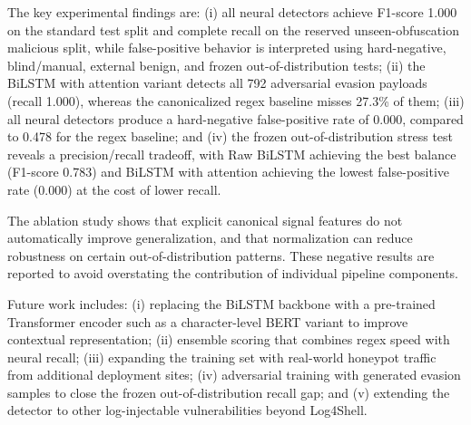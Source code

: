 \documentclass[conference]{IEEEtran}
\begin{document}
The key experimental findings are: (i) all neural detectors achieve F1-score
1.000 on the standard test split and complete recall on the reserved
unseen-obfuscation malicious split, while false-positive behavior is
interpreted using hard-negative, blind/manual, external benign, and frozen
out-of-distribution tests; (ii) the BiLSTM with attention variant detects all 792 adversarial evasion
payloads (recall 1.000), whereas the canonicalized regex baseline misses
27.3\% of them; (iii) all neural detectors produce a hard-negative
false-positive rate of 0.000, compared to 0.478 for the regex baseline;
and (iv) the frozen out-of-distribution stress test reveals a
precision/recall tradeoff, with Raw BiLSTM achieving the best balance
(F1-score 0.783) and BiLSTM with attention achieving the lowest
false-positive rate (0.000) at the cost of lower recall.

The ablation study shows that explicit canonical signal features do not
automatically improve generalization, and that normalization can reduce
robustness on certain out-of-distribution patterns. These negative results
are reported to avoid overstating the contribution of individual pipeline
components.

Future work includes: (i) replacing the BiLSTM backbone with a
pre-trained Transformer encoder such as a character-level BERT variant to
improve contextual representation; (ii) ensemble scoring that combines
regex speed with neural recall; (iii) expanding the training set with
real-world honeypot traffic from additional deployment sites;
(iv) adversarial training with generated evasion samples to close the
frozen out-of-distribution recall gap; and (v) extending the detector
to other log-injectable vulnerabilities beyond Log4Shell.
\end{document}
